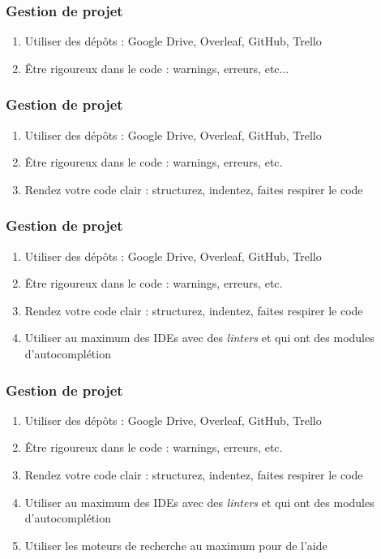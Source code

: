 \documentclass[handout]{beamer}
\begin{document}
	\begin{frame}
		\frametitle{Gestion de projet}
		\begin{enumerate}
			\item Utiliser des dépôts : Google Drive, Overleaf, GitHub, Trello
			\item Être rigoureux dans le code : warnings, erreurs, etc...
		\end{enumerate}
	\end{frame}

	\begin{frame}
		\frametitle{Gestion de projet}
		\begin{enumerate}
			\item Utiliser des dépôts : Google Drive, Overleaf, GitHub, Trello
			\item Être rigoureux dans le code : warnings, erreurs, etc.
			\item Rendez votre code clair : structurez, indentez, faites respirer le code
		\end{enumerate}
	\end{frame}

	\begin{frame}
		\frametitle{Gestion de projet}
		\begin{enumerate}
			\item Utiliser des dépôts : Google Drive, Overleaf, GitHub, Trello
			\item Être rigoureux dans le code : warnings, erreurs, etc.
			\item Rendez votre code clair : structurez, indentez, faites respirer le code
			\item Utiliser au maximum des IDEs avec des \textit{linters} et qui ont des modules d'autocomplétion
		\end{enumerate}
	\end{frame}

	\begin{frame}
		\frametitle{Gestion de projet}
		\begin{enumerate}
			\item Utiliser des dépôts : Google Drive, Overleaf, GitHub, Trello
			\item Être rigoureux dans le code : warnings, erreurs, etc.
			\item Rendez votre code clair : structurez, indentez, faites respirer le code
			\item Utiliser au maximum des IDEs avec des \textit{linters} et qui ont des modules d'autocomplétion
			\item Utiliser les moteurs de recherche au maximum pour de l'aide
		\end{enumerate}
	\end{frame}
\end{document}
